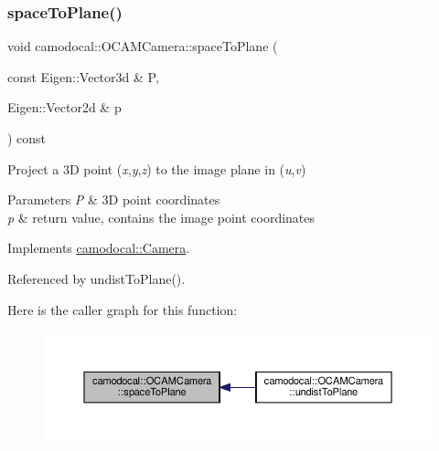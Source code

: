 \subsubsection{\texorpdfstring{space\+To\+Plane()}{spaceToPlane()}}
{\footnotesize\ttfamily void camodocal\+::\+O\+C\+A\+M\+Camera\+::space\+To\+Plane (\begin{DoxyParamCaption}\item[{const Eigen\+::\+Vector3d \&}]{P,  }\item[{Eigen\+::\+Vector2d \&}]{p }\end{DoxyParamCaption}) const\hspace{0.3cm}{\ttfamily [virtual]}}



Project a 3D point ({\itshape x},{\itshape y},{\itshape z}) to the image plane in ({\itshape u},{\itshape v}) 


\begin{DoxyParams}{Parameters}
{\em P} & 3D point coordinates \\
\hline
{\em p} & return value, contains the image point coordinates \\
\hline
\end{DoxyParams}


Implements \hyperlink{classcamodocal_1_1Camera_acf49bd1ef0919e0faf89d060dc497b52}{camodocal\+::\+Camera}.



Referenced by undist\+To\+Plane().

Here is the caller graph for this function\+:\nopagebreak
\begin{figure}[H]
\begin{center}
\leavevmode
\includegraphics[width=350pt]{classcamodocal_1_1OCAMCamera_a06125c8a4cdf39e0a9353b291802b0ed_icgraph}
\end{center}
\end{figure}
\mbox{\label{classcamodocal_1_1OCAMCamera_a804d705efdb76aa606f8cf4feddb2d7a}} 
